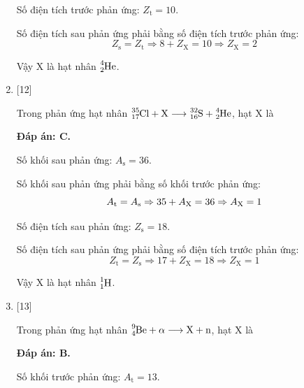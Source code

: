 \begin{enumerate}[label=\bfseries Câu \arabic*:]
{		Số điện tích trước phản ứng: $Z_\text{t} = 10$.
		
		Số điện tích sau phản ứng phải bằng số điện tích trước phản ứng:
		$$Z_\text{s} = Z_\text{t} \Rightarrow 8 + Z_\text{X} = 10 \Rightarrow Z_\text{X} = 2$$
		
		Vậy X là hạt nhân $\ce{^4_2 He}$.
		
	}
	
	
	
	\item {} [12]
	
	\cauhoi
	{Trong phản ứng hạt nhân $\ce{^35_17 Cl} + \ce{X} \longrightarrow \ce{^32_16 S} + \ce{^4_2 He}$, hạt X là
	}
	
	\loigiai
	{		\textbf{Đáp án: C.}
		
		Số khối sau phản ứng: $A_\text{s} = 36$.
		
		Số khối sau phản ứng phải bằng số khối trước phản ứng:
		$$A_\text{t} = A_\text{s} \Rightarrow 35+A_\text X = 36 \Rightarrow A_\text X = 1$$
		
		Số điện tích sau phản ứng: $Z_\text{s} = 18$.
		
		Số điện tích sau phản ứng phải bằng số điện tích trước phản ứng:
		$$Z_\text{t} = Z_\text{s} \Rightarrow 17 + Z_\text{X} = 18 \Rightarrow Z_\text{X} = 1$$
		
		Vậy X là hạt nhân $\ce{^1_1 H}$.
		
	}
	\item {} [13]
	
	\cauhoi
	{Trong phản ứng hạt nhân $\ce{^9_4 Be} + \ce{\alpha} \longrightarrow \ce{X} + \ce{n}$, hạt X là
	}
	
	\loigiai
	{		\textbf{Đáp án: B.}
		
		Số khối trước phản ứng: $A_\text{t} = 13$.
		
}
\end{enumerate}
